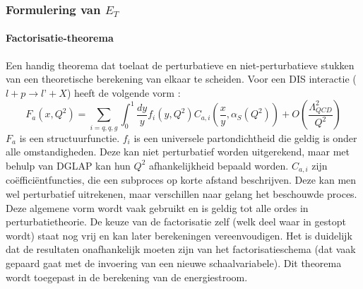 \documentclass[a4paper,11pt]{article}
\numberwithin{equation}{section} %
\begin{document}
    \subsubsection{Formulering van $E_T$}
      \paragraph{Factorisatie-theorema} \label{sec:FactorisatieTheorema}
Een handig theorema dat toelaat de perturbatieve en niet-perturbatieve stukken van een  theoretische berekening van elkaar te scheiden.
Voor een DIS interactie ($l+p\rightarrow l’+X$) heeft de volgende vorm \cite{Martin}: 
\begin{equation}
F_a(x, Q^2) = \sum_{i=q,q,g} \int_0^1 \frac{dy}{y} f_i(y, Q^2) C_{a,i} \left( \frac{x}{y},\alpha_S(Q^2) \right) + O \left( \frac{\Lambda_{QCD}^2}{Q^2} \right) 
\end{equation}
$F_a$ is een structuurfunctie.
$f_i$ is een universele partondichtheid die geldig is onder alle omstandigheden.
Deze kan niet perturbatief worden uitgerekend, maar met behulp van DGLAP kan hun $Q^2$ afhankelijkheid bepaald worden.
$C_{a,i}$ zijn coëfficiëntfuncties, die een subproces op korte afstand beschrijven.
Deze kan men wel perturbatief uitrekenen, maar verschillen naar gelang het beschouwde proces.
Deze algemene vorm wordt vaak gebruikt en is geldig tot alle ordes in perturbatietheorie.
De keuze van de factorisatie zelf (welk deel waar in gestopt wordt) staat nog vrij en kan later berekeningen vereenvoudigen.
Het is duidelijk dat de resultaten onafhankelijk moeten zijn van het factorisatieschema (dat vaak gepaard gaat met de invoering van een nieuwe schaalvariabele).
Dit theorema wordt toegepast in de berekening van de energiestroom.
\end{document}
